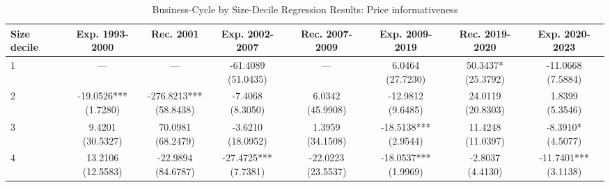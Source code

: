 \begin{table}[!htbp]\centering
\caption{Business-Cycle by Size-Decile Regression Results: Price informativeness}
\label{tab:cycle_size_detailed_price_info}
\begin{threeparttable}
\footnotesize
\setlength{\tabcolsep}{3.2pt}
\renewcommand{\arraystretch}{1.04}
\begin{tabular}{@{}lccccccc@{}}
\toprule
Size decile & Exp. 1993-2000 & Rec. 2001 & Exp. 2002-2007 & Rec. 2007-2009 & Exp. 2009-2019 & Rec. 2019-2020 & Exp. 2020-2023 \\
\midrule
1 & — & — & \shortstack{-61.4089\\(51.0435)} & — & \shortstack{6.0464\\(27.7230)} & \shortstack{50.3437*\\(25.3792)} & \shortstack{-11.0668\\(7.5884)} \\
2 & \shortstack{-19.0526***\\(1.7280)} & \shortstack{-276.8213***\\(58.8438)} & \shortstack{-7.4068\\(8.3050)} & \shortstack{6.0342\\(45.9908)} & \shortstack{-12.9812\\(9.6485)} & \shortstack{24.0119\\(20.8303)} & \shortstack{1.8399\\(5.3546)} \\
3 & \shortstack{9.4201\\(30.5327)} & \shortstack{70.0981\\(68.2479)} & \shortstack{-3.6210\\(18.0952)} & \shortstack{1.3959\\(34.1508)} & \shortstack{-18.5138***\\(2.9544)} & \shortstack{11.4248\\(11.0397)} & \shortstack{-8.3910*\\(4.5077)} \\
4 & \shortstack{13.2106\\(12.5583)} & \shortstack{-22.9894\\(84.6787)} & \shortstack{-27.4725***\\(7.7381)} & \shortstack{-22.0223\\(23.5537)} & \shortstack{-18.0537***\\(1.9969)} & \shortstack{-2.8037\\(4.4130)} & \shortstack{-11.7401***\\(3.1138)} \\

\end{tabular}
\end{threeparttable}
\end{table}
